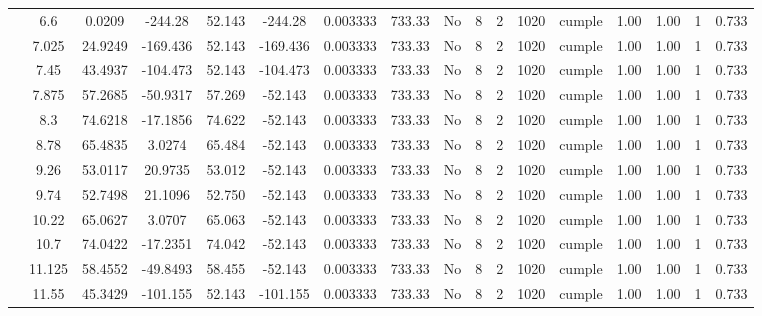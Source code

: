 \begin{table}[H]
{\begin{tabular}{|c|c|c|c|c|c|c|c|c|c|c|c|c|c|c|c|c|}
\cline{2-17}    & \cellcolor[rgb]{ .851,  .882,  .949}6.6 & 0.0209 & -244.28 & 52.143 & -244.28 & 0.003333 & 733.33 & No  & 8   & 2   & 1020 & \cellcolor[rgb]{ .776,  .937,  .808}cumple & 1.00 & 1.00 & 1   & 0.733 \bigstrut\\
\cline{2-17}    & 7.025 & 24.9249 & -169.436 & 52.143 & -169.436 & 0.003333 & 733.33 & No  & 8   & 2   & 1020 & \cellcolor[rgb]{ .776,  .937,  .808}cumple & 1.00 & 1.00 & 1   & 0.733 \bigstrut\\
\cline{2-17}    & 7.45 & 43.4937 & -104.473 & 52.143 & -104.473 & 0.003333 & 733.33 & No  & 8   & 2   & 1020 & \cellcolor[rgb]{ .776,  .937,  .808}cumple & 1.00 & 1.00 & 1   & 0.733 \bigstrut\\
\cline{2-17}    & 7.875 & 57.2685 & -50.9317 & 57.269 & -52.143 & 0.003333 & 733.33 & No  & 8   & 2   & 1020 & \cellcolor[rgb]{ .776,  .937,  .808}cumple & 1.00 & 1.00 & 1   & 0.733 \bigstrut\\
\cline{2-17}    & 8.3 & 74.6218 & -17.1856 & 74.622 & -52.143 & 0.003333 & 733.33 & No  & 8   & 2   & 1020 & \cellcolor[rgb]{ .776,  .937,  .808}cumple & 1.00 & 1.00 & 1   & 0.733 \bigstrut\\
\cline{2-17}    & 8.78 & 65.4835 & 3.0274 & 65.484 & -52.143 & 0.003333 & 733.33 & No  & 8   & 2   & 1020 & \cellcolor[rgb]{ .776,  .937,  .808}cumple & 1.00 & 1.00 & 1   & 0.733 \bigstrut\\
\cline{2-17}    & 9.26 & 53.0117 & 20.9735 & 53.012 & -52.143 & 0.003333 & 733.33 & No  & 8   & 2   & 1020 & \cellcolor[rgb]{ .776,  .937,  .808}cumple & 1.00 & 1.00 & 1   & 0.733 \bigstrut\\
\cline{2-17}    & 9.74 & 52.7498 & 21.1096 & 52.750 & -52.143 & 0.003333 & 733.33 & No  & 8   & 2   & 1020 & \cellcolor[rgb]{ .776,  .937,  .808}cumple & 1.00 & 1.00 & 1   & 0.733 \bigstrut\\
\cline{2-17}    & 10.22 & 65.0627 & 3.0707 & 65.063 & -52.143 & 0.003333 & 733.33 & No  & 8   & 2   & 1020 & \cellcolor[rgb]{ .776,  .937,  .808}cumple & 1.00 & 1.00 & 1   & 0.733 \bigstrut\\
\cline{2-17}    & 10.7 & 74.0422 & -17.2351 & 74.042 & -52.143 & 0.003333 & 733.33 & No  & 8   & 2   & 1020 & \cellcolor[rgb]{ .776,  .937,  .808}cumple & 1.00 & 1.00 & 1   & 0.733 \bigstrut\\
\cline{2-17}    & 11.125 & 58.4552 & -49.8493 & 58.455 & -52.143 & 0.003333 & 733.33 & No  & 8   & 2   & 1020 & \cellcolor[rgb]{ .776,  .937,  .808}cumple & 1.00 & 1.00 & 1   & 0.733 \bigstrut\\
\cline{2-17}    & 11.55 & 45.3429 & -101.155 & 52.143 & -101.155 & 0.003333 & 733.33 & No  & 8   & 2   & 1020 & \cellcolor[rgb]{ .776,  .937,  .808}cumple & 1.00 & 1.00 & 1   & 0.733 \bigstrut\\

\end{tabular}}
\end{table}
